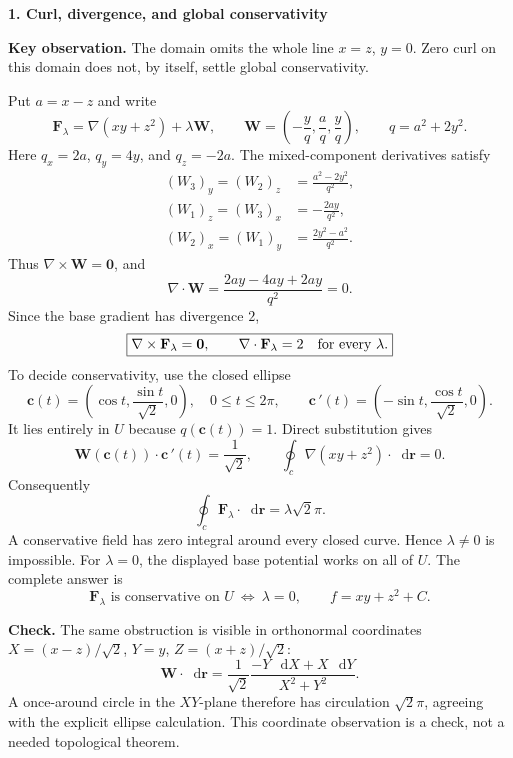 \documentclass[11pt,letterpaper]{article}
\newcommand{\curl}{\nabla\times}
\newcommand{\dv}{\nabla\cdot}
\renewcommand{\vec}[1]{\mathbf{#1}}
\newcommand{\dd}{\mathop{}\!\mathrm{d}}
\newcommand{\grad}{\nabla}
\newcommand{\solutionproblem}[3]{%
  \par\bigskip\Needspace{7\baselineskip}
  \noindent\textbf{#1. #2}\par\nobreak
}
\newcommand{\insight}[1]{\par\textbf{Key observation.} #1\par}
\newcommand{\verification}[1]{\par\textbf{Check.} #1\par}
\begin{document}
\solutionproblem{1}{Curl, divergence, and global conservativity}{10}
\insight{The domain omits the whole line $x=z$, $y=0$.
Zero curl on this domain does not, by itself, settle global conservativity.}
Put $a=x-z$ and write
\[
\vec F_\lambda=\grad(xy+z^2)+\lambda\vec W,
\qquad \vec W=\left(-\frac yq,\frac aq,\frac yq\right),
\qquad q=a^2+2y^2.
\]
Here $q_x=2a$, $q_y=4y$, and $q_z=-2a$. The mixed-component
derivatives satisfy
\[
\begin{aligned}
(W_3)_y=(W_2)_z&=\frac{a^2-2y^2}{q^2},\\
(W_1)_z=(W_3)_x&=-\frac{2ay}{q^2},\\
(W_2)_x=(W_1)_y&=\frac{2y^2-a^2}{q^2}.
\end{aligned}
\]
Thus $\curl\vec W=\vec0$, and
\[
\dv\vec W=\frac{2ay-4ay+2ay}{q^2}=0.
\]
Since the base gradient has divergence $2$,
\[
\boxed{\curl\vec F_\lambda=\vec0,\qquad
\dv\vec F_\lambda=2\quad\hbox{for every }\lambda.}
\]
To decide conservativity, use the closed ellipse
\[
\vec c(t)=\left(\cos t,\frac{\sin t}{\sqrt2},0\right),
\quad0\le t\le2\pi,\qquad
\vec c\,'(t)=\left(-\sin t,\frac{\cos t}{\sqrt2},0\right).
\]
It lies entirely in $U$ because $q(\vec c(t))=1$. Direct substitution gives
\[
\vec W(\vec c(t))\cdot\vec c\,'(t)=\frac1{\sqrt2},\qquad
\oint_c\grad(xy+z^2)\cdot\dd\vec r=0.
\]
Consequently
\[
\oint_c\vec F_\lambda\cdot\dd\vec r=\lambda\sqrt2\pi.
\]
A conservative field has zero integral around every closed curve.
Hence $\lambda\ne0$ is impossible. For $\lambda=0$, the displayed
base potential works on all of $U$. The complete answer is
\[
\boxed{\vec F_\lambda\text{ is conservative on }U
\ \Longleftrightarrow\ \lambda=0,\qquad f=xy+z^2+C.}
\]
\verification{The same obstruction is visible in orthonormal coordinates
$X=(x-z)/\sqrt2$, $Y=y$, $Z=(x+z)/\sqrt2$:
\[
\vec W\cdot\dd\vec r
=\frac1{\sqrt2}\frac{-Y\,\dd X+X\,\dd Y}{X^2+Y^2}.
\]
A once-around circle in the $XY$-plane therefore has circulation
$\sqrt2\pi$, agreeing with the explicit ellipse calculation. This
coordinate observation is a check, not a needed topological theorem.}
\end{document}
